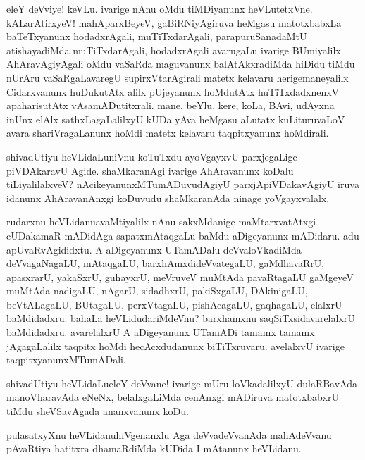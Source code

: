 \begin{mng}
eleY deVviye! keVLu. ivarige nAnu oMdu tiMDiyanunx heVLutetxVne. kALarAtirxyeV! mahAparxBeyeV, gaBiRNiyAgiruva heMgasu matotxbabxLa baTeTxyanunx hodadxrAgali, muTiTxdarAgali, parapuruSanadaMtU atishayadiMda muTiTxdarAgali, hodadxrAgali avarugaLu ivarige BUmiyalilx AhAravAgiyAgali oMdu vaSaRda maguvanunx balAtAkxradiMda hiDidu tiMdu nUrAru vaSaRgaLavaregU supirxVtarAgirali matetx kelavaru herigemaneyalilx Cidarxvanunx huDukutAtx alilx pUjeyanunx hoMdutAtx huTiTxdadxnenxV apaharisutAtx vAsamADutitxrali. mane, beYlu, kere, koLa, BAvi, udAyxna inUnx elAlx sathxLagaLalilxyU kUDa yAva heMgasu aLutatx kuLituruvaLoV avara shariVragaLanunx hoMdi matetx kelavaru taqpitxyanunx hoMdirali.
\end{mng}

\begin{mng}
shivadUtiyu heVLidaLu\mdash niVnu koTuTxdu ayoVgayxvU parxjegaLige piVDAkaravU Agide. shaMkaranAgi ivarige AhAravanunx koDalu tiLiyalilalxveV? nAcikeyanunxMTumADuvudAgiyU parxjApiVDakavAgiyU iruva idanunx AhAravanAnxgi koDuvudu shaMkaranAda ninage yoVgayxvalalx.
\end{mng}

\begin{mng}
rudarxnu heVLidanu\mdash avaMtiyalilx nAnu sakxMdanige maMtarxvatAtxgi cUDakamaR mADidAga sapatxmAtaqgaLu baMdu aDigeyanunx mADidaru. adu apUvaRvAgididxtu. A aDigeyanunx UTamADalu deVvaloVkadiMda deVvagaNagaLU, mAtaqgaLU, barxhAmxdideVvategaLU, gaMdhavaRrU, apasxrarU, yakaSxrU, guhayxrU, meVruveV muMtAda pavaRtagaLU gaMgeyeV muMtAda nadigaLU, nAgarU, sidadhxrU, pakiSxgaLU, DAkinigaLU, beVtALagaLU, BUtagaLU, perxVtagaLU, pishAcagaLU, gaqhagaLU, elalxrU baMdidadxru. bahaLa heVLidudariMdeVnu? barxhamxnu saqSiTxsidavarelalxrU baMdidadxru. avarelalxrU A aDigeyanunx UTamADi tamamx tamamx jAgagaLalilx taqpitx hoMdi hecAcxdudanunx biTiTxruvaru. avelalxvU ivarige taqpitxyanunxMTumADali.
\end{mng}

\begin{mng}
shivadUtiyu heVLidaLu\mdash eleY deVvane! ivarige mUru loVkadalilxyU dulaRBavAda manoVharavAda eNeNx, belalxgaLiMda cenAnxgi mADiruva matotxbabxrU tiMdu sheVSavAgada ananxvanunx koDu.
\end{mng}

\begin{mng}
pulasatxyXnu heVLidanu\mdash hiVgenanxlu Aga deVvadeVvanAda mahAdeVvanu pAvaRtiya hatitxra dhamaRdiMda kUDida I mAtanunx heVLidanu.
\end{mng}

